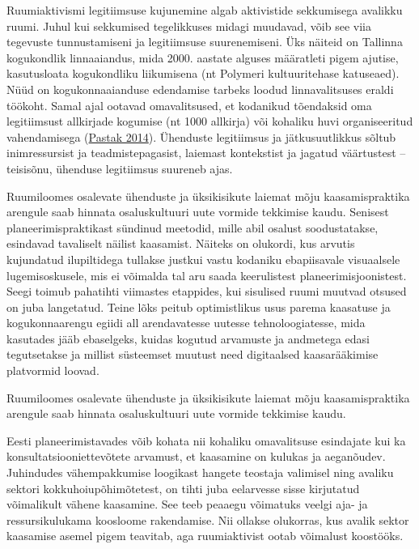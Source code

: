 \documentclass[estonian,]{article}
\begin{document}
Ruumiaktivismi legitiimsuse kujunemine algab aktivistide sekkumisega avalikku ruumi. Juhul kui sekkumised tegelikkuses midagi muudavad, võib see viia tegevuste tunnustamiseni ja legitiimsuse suurenemiseni. Üks näiteid on Tallinna kogukondlik linnaaiandus, mida 2000. aastate alguses määratleti pigem ajutise, kasutusloata kogukondliku liikumisena (nt Polymeri kultuuritehase katuseaed). Nüüd on kogukonnaaianduse edendamise tarbeks loodud linnavalitsuses eraldi töökoht. Samal ajal ootavad omavalitsused, et kodanikud tõendaksid oma legitiimsust allkirjade kogumise (nt 1000 allkirja) või kohaliku huvi organiseeritud vahendamisega (\protect\hyperlink{Pastak2014}{Pastak 2014}). Ühenduste legitiimsus ja jätkusuutlikkus sõltub inimressursist ja teadmistepagasist, laiemast kontekstist ja jagatud väärtustest -- teisisõnu, ühenduse legitiimsus suureneb ajas.

Ruumiloomes osalevate ühenduste ja üksikisikute laiemat mõju kaasamispraktika arengule saab hinnata osaluskultuuri uute vormide tekkimise kaudu. Senisest planeerimispraktikast sündinud meetodid, mille abil osalust soodustatakse, esindavad tavaliselt näilist kaasamist. Näiteks on olukordi, kus arvutis kujundatud ilupiltidega tullakse justkui vastu kodaniku ebapiisavale visuaalsele lugemisoskusele, mis ei võimalda tal aru saada keerulistest planeerimisjoonistest. Seegi toimub pahatihti viimastes etappides, kui sisulised ruumi muutvad otsused on juba langetatud. Teine lõks peitub optimistlikus usus parema kaasatuse ja kogukonnaarengu egiidi all arendavatesse uutesse tehnoloogiatesse, mida kasutades jääb ebaselgeks, kuidas kogutud arvamuste ja andmetega edasi tegutsetakse ja millist süsteemset muutust need digitaalsed kaasarääkimise platvormid loovad.

\begin{blockquote-left}
Ruumiloomes osalevate ühenduste ja üksikisikute laiemat mõju
kaasamispraktika arengule saab hinnata osaluskultuuri uute vormide
tekkimise kaudu.
\end{blockquote-left}

Eesti planeerimistavades võib kohata nii kohaliku omavalitsuse esindajate kui ka konsultatsiooniettevõtete arvamust, et kaasamine on kulukas ja aeganõudev. Juhindudes vähempakkumise loogikast hangete teostaja valimisel ning avaliku sektori kokkuhoiupõhimõtetest, on tihti juba eelarvesse sisse kirjutatud võimalikult vähene kaasamine. See teeb peaaegu võimatuks veelgi aja- ja ressursikulukama koosloome rakendamise. Nii ollakse olukorras, kus avalik sektor kaasamise asemel pigem teavitab, aga ruumiaktivist ootab võimalust koostööks.
\end{document}
